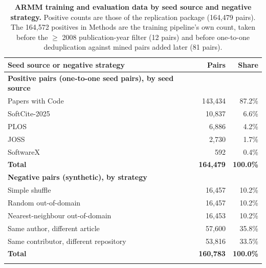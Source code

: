 \documentclass[pdflatex,sn-nature]{sn-jnl}%
\begin{document}
\begin{table}[p]
\caption{\textbf{ARMM training and evaluation data by seed source and negative strategy.} Positive counts are those of the replication package (164,479 pairs). The 164,572 positives in Methods are the training pipeline's own count, taken before the $\geq$ 2008 publication-year filter (12 pairs) and before one-to-one deduplication against mined pairs added later (81 pairs).}\label{stab:armmdata}
\begin{tabular}{@{}lrr@{}}
\toprule
Seed source or negative strategy & Pairs & Share \\
\midrule
\textbf{Positive pairs (one-to-one seed pairs), by seed source} & & \\
\quad Papers with Code & 143,434 & 87.2\% \\
\quad SoftCite-2025 & 10,837 & 6.6\% \\
\quad PLOS & 6,886 & 4.2\% \\
\quad JOSS & 2,730 & 1.7\% \\
\quad SoftwareX & 592 & 0.4\% \\
\quad \textbf{Total} & \textbf{164,479} & \textbf{100.0\%} \\
\midrule
\textbf{Negative pairs (synthetic), by strategy} & & \\
\quad Simple shuffle & 16,457 & 10.2\% \\
\quad Random out-of-domain & 16,457 & 10.2\% \\
\quad Nearest-neighbour out-of-domain & 16,453 & 10.2\% \\
\quad Same author, different article & 57,600 & 35.8\% \\
\quad Same contributor, different repository & 53,816 & 33.5\% \\
\quad \textbf{Total} & \textbf{160,783} & \textbf{100.0\%} \\
\botrule
\end{tabular}
\end{table}

\clearpage



\end{document}
